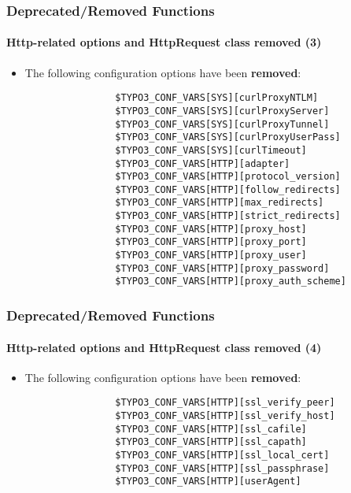\begin{frame}[fragile]
	\frametitle{Deprecated/Removed Functions}
	\framesubtitle{Http-related options and HttpRequest class removed (3)}

	\begin{itemize}

		\item The following configuration options have been \textbf{removed}:
			\begin{lstlisting}
				$TYPO3_CONF_VARS[SYS][curlProxyNTLM]
				$TYPO3_CONF_VARS[SYS][curlProxyServer]
				$TYPO3_CONF_VARS[SYS][curlProxyTunnel]
				$TYPO3_CONF_VARS[SYS][curlProxyUserPass]
				$TYPO3_CONF_VARS[SYS][curlTimeout]
				$TYPO3_CONF_VARS[HTTP][adapter]
				$TYPO3_CONF_VARS[HTTP][protocol_version]
				$TYPO3_CONF_VARS[HTTP][follow_redirects]
				$TYPO3_CONF_VARS[HTTP][max_redirects]
				$TYPO3_CONF_VARS[HTTP][strict_redirects]
				$TYPO3_CONF_VARS[HTTP][proxy_host]
				$TYPO3_CONF_VARS[HTTP][proxy_port]
				$TYPO3_CONF_VARS[HTTP][proxy_user]
				$TYPO3_CONF_VARS[HTTP][proxy_password]
				$TYPO3_CONF_VARS[HTTP][proxy_auth_scheme]
			\end{lstlisting}
	\end{itemize}

\end{frame}


\begin{frame}[fragile]
	\frametitle{Deprecated/Removed Functions}
	\framesubtitle{Http-related options and HttpRequest class removed (4)}

	\begin{itemize}

		\item The following configuration options have been \textbf{removed}:
			\begin{lstlisting}
				$TYPO3_CONF_VARS[HTTP][ssl_verify_peer]
				$TYPO3_CONF_VARS[HTTP][ssl_verify_host]
				$TYPO3_CONF_VARS[HTTP][ssl_cafile]
				$TYPO3_CONF_VARS[HTTP][ssl_capath]
				$TYPO3_CONF_VARS[HTTP][ssl_local_cert]
				$TYPO3_CONF_VARS[HTTP][ssl_passphrase]
				$TYPO3_CONF_VARS[HTTP][userAgent]
			\end{lstlisting}
	\end{itemize}

\end{frame}

